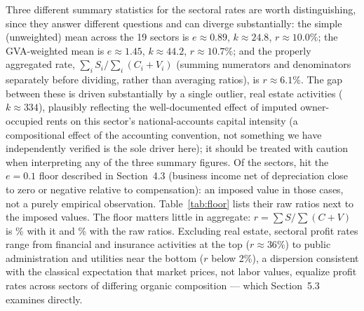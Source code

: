 \documentclass[11pt]{article}
\begin{document}
Three different summary statistics for the sectoral rates are worth
distinguishing, since they answer different questions and can diverge
substantially: the simple (unweighted) mean across the 19 sectors is
$e\approx0.89$, $k\approx24.8$, $r\approx10.0\%$; the GVA-weighted mean
is $e\approx1.45$, $k\approx44.2$, $r\approx10.7\%$; and the properly
aggregated rate, $\sum_iS_i/\sum_i(C_i+V_i)$ (summing numerators and
denominators separately before dividing, rather than averaging ratios),
is $r\approx6.1\%$. The gap between these is driven substantially by a
single outlier, real estate activities ($k\approx334$), plausibly
reflecting the well-documented effect of imputed owner-occupied rents on
this sector's national-accounts capital intensity (a compositional
effect of the accounting convention, not something we have independently
verified is the sole driver here); it should be treated with caution
when interpreting any of the three summary figures. Of the
\FloorSectors{} sectors, \FloorN{} hit the $e=0.1$ floor described in
Section~4.3 (business income net of depreciation close to zero or
negative relative to compensation): an imposed value in those cases, not
a purely empirical observation. Table~\ref{tab:floor} lists their raw
ratios next to the imposed values. The floor matters little in
aggregate: $r=\sum S/\sum(C+V)$ is \FloorAggR\% with it and
\FloorAggRRaw\% with the raw ratios. Excluding real estate, sectoral profit rates range from
financial and insurance activities at the top ($r\approx36\%$) to public
administration and utilities near the bottom ($r$ below 2\%), a
dispersion consistent with the classical expectation that market prices,
not labor values, equalize profit rates across sectors of differing
organic composition --- which Section~5.3 examines directly.

\begin{table}[htbp]
\centering
\caption{Sectoral calibration, Portugal, 2022 (real Eurostat data). GVA
is the sector's real gross value added, not a quantity reconstructed
from other columns.}
\label{tab:sectors}

\end{table}

\begin{table}[htbp]
\centering
\caption{Sectors at the $e=0.1$ floor, Portugal, 2022. Raw $e$ is business
income net of consumption of fixed capital over compensation, before the
floor; raw $r=e/(k+1)$ uses that raw value. Generated by
\texttt{paper/generate\_results.jl}.}
\label{tab:floor}

\end{table}
\end{document}
